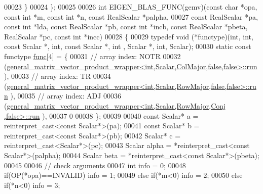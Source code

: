 \begin{DoxyCode}
00023   \}
00024 \};
00025 
00026 \textcolor{keywordtype}{int} EIGEN\_BLAS\_FUNC(gemv)(\textcolor{keyword}{const} \textcolor{keywordtype}{char} *opa, \textcolor{keyword}{const} \textcolor{keywordtype}{int} *m, \textcolor{keyword}{const} \textcolor{keywordtype}{int} *n, \textcolor{keyword}{const} RealScalar *palpha,
00027                           \textcolor{keyword}{const} RealScalar *pa, \textcolor{keyword}{const} \textcolor{keywordtype}{int} *lda, \textcolor{keyword}{const} RealScalar *pb, \textcolor{keyword}{const} \textcolor{keywordtype}{int} *incb, \textcolor{keyword}{
      const} RealScalar *pbeta, RealScalar *pc, \textcolor{keyword}{const} \textcolor{keywordtype}{int} *incc)
00028 \{
00029   \textcolor{keyword}{typedef} void (*functype)(int, int, \textcolor{keyword}{const} Scalar *, int, \textcolor{keyword}{const} Scalar *, int , Scalar *, int, Scalar);
00030   \textcolor{keyword}{static} \textcolor{keyword}{const} functype \hyperlink{structfunc}{func}[4] = \{
00031     \textcolor{comment}{// array index: NOTR}
00032     (\hyperlink{structgeneral__matrix__vector__product__wrapper}{general\_matrix\_vector\_product\_wrapper<int,Scalar,ColMajor,false,false>::run}
      ),
00033     \textcolor{comment}{// array index: TR  }
00034     (\hyperlink{structgeneral__matrix__vector__product__wrapper}{general\_matrix\_vector\_product\_wrapper<int,Scalar,RowMajor,false,false>::run}
      ),
00035     \textcolor{comment}{// array index: ADJ }
00036     (\hyperlink{structgeneral__matrix__vector__product__wrapper}{general\_matrix\_vector\_product\_wrapper<int,Scalar,RowMajor,Conj ,false>::run}
      ),
00037     0
00038   \};
00039 
00040   \textcolor{keyword}{const} Scalar* a = \textcolor{keyword}{reinterpret\_cast<}\textcolor{keyword}{const }Scalar*\textcolor{keyword}{>}(pa);
00041   \textcolor{keyword}{const} Scalar* b = \textcolor{keyword}{reinterpret\_cast<}\textcolor{keyword}{const }Scalar*\textcolor{keyword}{>}(pb);
00042   Scalar* c = \textcolor{keyword}{reinterpret\_cast<}Scalar*\textcolor{keyword}{>}(pc);
00043   Scalar alpha  = *\textcolor{keyword}{reinterpret\_cast<}\textcolor{keyword}{const }Scalar*\textcolor{keyword}{>}(palpha);
00044   Scalar beta   = *\textcolor{keyword}{reinterpret\_cast<}\textcolor{keyword}{const }Scalar*\textcolor{keyword}{>}(pbeta);
00045 
00046   \textcolor{comment}{// check arguments}
00047   \textcolor{keywordtype}{int} info = 0;
00048   \textcolor{keywordflow}{if}(OP(*opa)==INVALID)           info = 1;
00049   \textcolor{keywordflow}{else} \textcolor{keywordflow}{if}(*m<0)                   info = 2;
00050   \textcolor{keywordflow}{else} \textcolor{keywordflow}{if}(*n<0)                   info = 3;

\end{DoxyCode}
